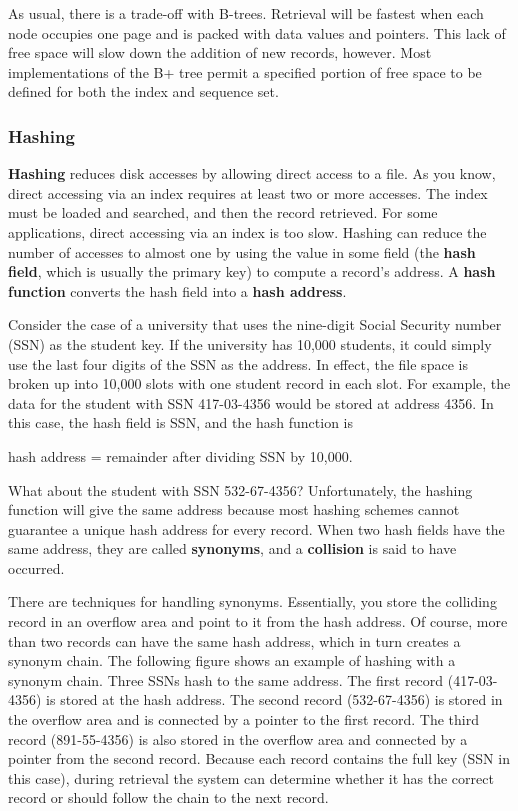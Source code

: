 \documentclass[
]{article}
\begin{document}
As usual, there is a trade-off with B-trees. Retrieval will be fastest
when each node occupies one page and is packed with data values and
pointers. This lack of free space will slow down the addition of new
records, however. Most implementations of the B+ tree permit a specified
portion of free space to be defined for both the index and sequence set.

\hypertarget{hashing}{%
\subsubsection*{Hashing}\label{hashing}}

\textbf{Hashing} reduces disk accesses by allowing direct access to a file.
As you know, direct accessing via an index requires at least two or more
accesses. The index must be loaded and searched, and then the record
retrieved. For some applications, direct accessing via an index is too
slow. Hashing can reduce the number of accesses to almost one by using
the value in some field (the \textbf{hash field}, which is usually the
primary key) to compute a record's address. A \textbf{hash function} converts
the hash field into a \textbf{hash address}.

Consider the case of a university that uses the nine-digit Social
Security number (SSN) as the student key. If the university has 10,000
students, it could simply use the last four digits of the SSN as the
address. In effect, the file space is broken up into 10,000 slots with
one student record in each slot. For example, the data for the student
with SSN 417-03-4356 would be stored at address 4356. In this case, the
hash field is SSN, and the hash function is

hash address = remainder after dividing SSN by 10,000.

What about the student with SSN 532-67-4356? Unfortunately, the hashing
function will give the same address because most hashing schemes cannot
guarantee a unique hash address for every record. When two hash fields
have the same address, they are called \textbf{synonyms}, and a \textbf{collision}
is said to have occurred.

There are techniques for handling synonyms. Essentially, you store the
colliding record in an overflow area and point to it from the hash
address. Of course, more than two records can have the same hash
address, which in turn creates a synonym chain. The following figure
shows an example of hashing with a synonym chain. Three SSNs hash to the
same address. The first record (417-03-4356) is stored at the hash
address. The second record (532-67-4356) is stored in the overflow area
and is connected by a pointer to the first record. The third record
(891-55-4356) is also stored in the overflow area and connected by a
pointer from the second record. Because each record contains the full
key (SSN in this case), during retrieval the system can determine
whether it has the correct record or should follow the chain to the next
record.
\end{document}
